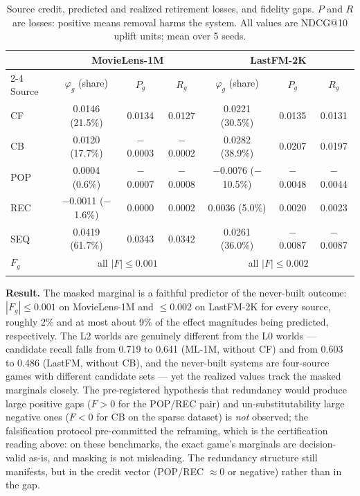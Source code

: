 \documentclass[pdflatex,sn-mathphys-num]{sn-jnl}
\theoremstyle{thmstyleone}%
\theoremstyle{thmstyletwo}%
\theoremstyle{thmstylethree}%
\newcommand{\reg}{R}
\newcommand{\pred}{P}
\begin{document}
\begin{table}[h]
\caption{Source credit, predicted and realized retirement losses, and fidelity gaps. $\pred$ and $\reg$ are losses: positive means removal harms the system. All values are NDCG@10 uplift units; mean over 5 seeds.}
\label{tab4}
\begin{tabular*}{\textwidth}{@{\extracolsep\fill}lcccccc}
\toprule
 & \multicolumn{3}{c}{MovieLens-1M} & \multicolumn{3}{c}{LastFM-2K} \\
\cmidrule{2-4}\cmidrule{5-7}
Source & $\varphi_g$ (share) & $\pred_g$ & $\reg_g$ & $\varphi_g$ (share) & $\pred_g$ & $\reg_g$ \\
\midrule
CF & 0.0146 (21.5\%) & 0.0134 & 0.0127 & 0.0221 (30.5\%) & 0.0135 & 0.0131 \\
CB & 0.0120 (17.7\%) & $-$0.0003 & $-$0.0002 & 0.0282 (38.9\%) & 0.0207 & 0.0197 \\
POP & 0.0004 (0.6\%) & $-$0.0007 & $-$0.0008 & $-$0.0076 ($-$10.5\%) & $-$0.0048 & $-$0.0044 \\
REC & $-$0.0011 ($-$1.6\%) & 0.0000 & 0.0002 & 0.0036 (5.0\%) & 0.0020 & 0.0023 \\
SEQ & 0.0419 (61.7\%) & 0.0343 & 0.0342 & 0.0261 (36.0\%) & $-$0.0087 & $-$0.0087 \\
\midrule
$F_g$ & \multicolumn{3}{c}{all $|F|\le 0.001$} & \multicolumn{3}{c}{all $|F|\le 0.002$} \\
\botrule
\end{tabular*}
\end{table}

\textbf{Result.} The masked marginal is a faithful predictor of the never-built outcome: $|F_g| \le 0.001$ on MovieLens-1M and $\le 0.002$ on LastFM-2K for every source, roughly 2\% and at most about 9\% of the effect magnitudes being predicted, respectively. The L2 worlds are genuinely different from the L0 worlds --- candidate recall falls from 0.719 to 0.641 (ML-1M, without CF) and from 0.603 to 0.486 (LastFM, without CB), and the never-built systems are four-source games with different candidate sets --- yet the realized values track the masked marginals closely. The pre-registered hypothesis that redundancy would produce large positive gaps ($F>0$ for the POP/REC pair) and un-substitutability large negative ones ($F<0$ for CB on the sparse dataset) is \emph{not} observed; the falsification protocol pre-committed the reframing, which is the certification reading above: on these benchmarks, the exact game's marginals are decision-valid as-is, and masking is not misleading. The redundancy structure still manifests, but in the credit vector (POP/REC $\approx 0$ or negative) rather than in the gap.
\end{document}
